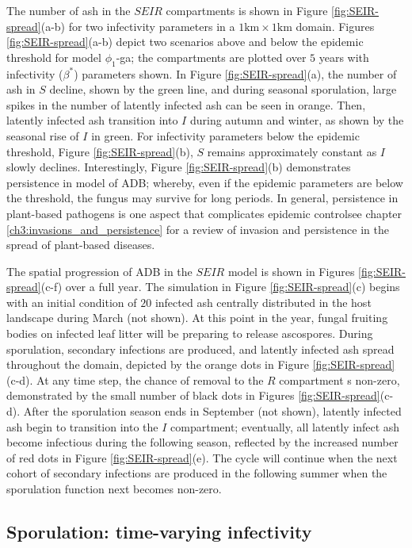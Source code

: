 The number of ash in the $SEIR$ compartments is shown in Figure \ref{fig:SEIR-spread}(a-b) for two infectivity parameters in a $1\mathrm{km}\times1\mathrm{km}$ domain.
Figures \ref{fig:SEIR-spread}(a-b) depict two scenarios above and below the epidemic threshold for model $\phi_1$-ga;
the compartments are plotted over $5$ years with infectivity ($\beta^*$) parameters shown. 
In Figure \ref{fig:SEIR-spread}(a), the number of ash in $S$ decline, shown by the green line,
and during seasonal sporulation, large spikes in the number of latently infected ash can be seen in orange. 
Then, latently infected ash transition into $I$ during autumn and winter, as shown by the seasonal rise of $I$ in green.
For infectivity parameters below the epidemic threshold, Figure \ref{fig:SEIR-spread}(b), $S$ remains approximately constant as $I$ slowly declines. 
Interestingly, Figure \ref{fig:SEIR-spread}(b) demonstrates persistence in model of ADB; 
whereby, even if the epidemic parameters are below the threshold, the fungus may survive for long periods. 
In general, persistence in plant-based pathogens is one aspect that complicates epidemic control\textemdash see chapter \ref{ch3:invasions_and_persistence} for a review of invasion and persistence in the spread of plant-based diseases.

The spatial progression of ADB in the $SEIR$ model is shown in Figures \ref{fig:SEIR-spread}(c-f) over a full year. 
The simulation in Figure \ref{fig:SEIR-spread}(c) begins with an initial condition of $20$ infected ash centrally distributed in the host landscape during March (not shown). 
At this point in the year, fungal fruiting bodies on infected leaf litter will be preparing to release ascospores.
During sporulation, secondary infections are produced, and latently infected ash spread throughout the domain, depicted by the orange dots in Figure \ref{fig:SEIR-spread}(c-d). 
At any time step, the chance of removal to the $R$ compartment s non-zero, demonstrated by the small number of black dots in Figures \ref{fig:SEIR-spread}(c-d).
After the sporulation season ends in September (not shown), latently infected ash begin to transition into the $I$ compartment;
eventually, all latently infect ash become infectious during the following season, reflected by the increased number of red dots in Figure \ref{fig:SEIR-spread}(e). 
The cycle will continue when the next cohort of secondary infections are produced in the following summer when the sporulation function next becomes non-zero.

\subsection{Sporulation: time-varying infectivity}
\label{ch6:sporulation}

